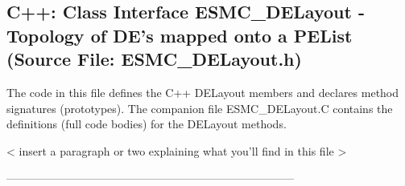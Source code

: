  
\parskip        0pt
\parindent      0pt
\baselineskip  11pt
 
\def\bv{\begin{verbatim}}
\def\ev{\end{verbatim}}
\def\be{\begin{equation}}
\def\ee{\end{equation}}
\def\bea{\begin{eqnarray}}
\def\eea{\end{eqnarray}}
\def\bi{\begin{itemize}}
\def\ei{\end{itemize}}
\def\bn{\begin{enumerate}}
\def\en{\end{enumerate}}
\def\bd{\begin{description}}
\def\ed{\end{description}}
\def\({\left (}
\def\){\right )}
\def\[{\left [}
\def\]{\right ]}
\def\<{\left  \langle}
\def\>{\right \rangle}
\def\cI{{\cal I}}
\def\diag{\mathop{\rm diag}}
\def\tr{\mathop{\rm tr}}


 
\subsection{C++:  Class Interface ESMC\_DELayout - Topology of DE's mapped onto a PEList (Source File: ESMC\_DELayout.h)}


  
  
   The code in this file defines the C++ DELayout members and declares method 
   signatures (prototypes).  The companion file ESMC\_DELayout.C contains
   the definitions (full code bodies) for the DELayout methods.
  
   < insert a paragraph or two explaining what you'll find in this file >
  
  -----------------------------------------------------------------------------
   
